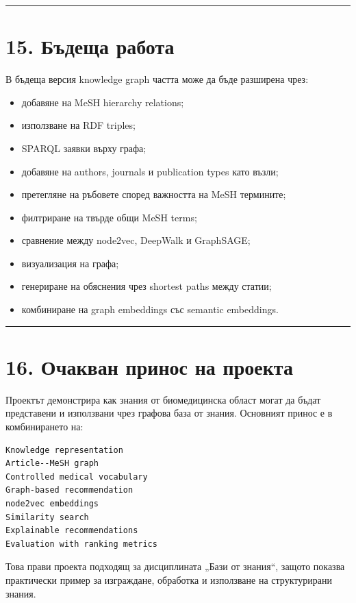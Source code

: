 \documentclass[12pt,a4paper]{article}
\providecommand{\tightlist}{\setlength{\itemsep}{0pt}\setlength{\parskip}{0pt}}
\begin{document}
\vspace{0.5em}\hrule\vspace{1.0em}

\section{15. Бъдеща работа}

В бъдеща версия knowledge graph частта може да бъде разширена чрез:

\begin{itemize}
\tightlist
\item
  добавяне на MeSH hierarchy relations;
\item
  използване на RDF triples;
\item
  SPARQL заявки върху графа;
\item
  добавяне на authors, journals и publication types като възли;
\item
  претегляне на ръбовете според важността на MeSH термините;
\item
  филтриране на твърде общи MeSH terms;
\item
  сравнение между node2vec, DeepWalk и GraphSAGE;
\item
  визуализация на графа;
\item
  генериране на обяснения чрез shortest paths между статии;
\item
  комбиниране на graph embeddings със semantic embeddings.
\end{itemize}

\vspace{0.5em}\hrule\vspace{1.0em}

\section{16. Очакван принос на проекта}

Проектът демонстрира как знания от биомедицинска област могат да бъдат представени и използвани чрез графова база от знания. Основният принос е в комбинирането на:

\begin{verbatim}
Knowledge representation
Article--MeSH graph
Controlled medical vocabulary
Graph-based recommendation
node2vec embeddings
Similarity search
Explainable recommendations
Evaluation with ranking metrics
\end{verbatim}

Това прави проекта подходящ за дисциплината „Бази от знания“, защото показва практически пример за изграждане, обработка и използване на структурирани знания.
\end{document}
